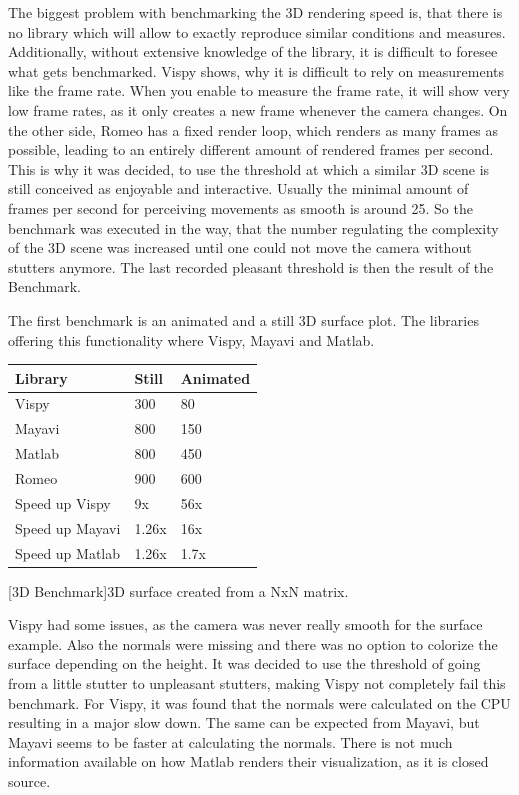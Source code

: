 The biggest problem with benchmarking the 3D rendering speed is, that there is no library which will allow to exactly reproduce similar conditions and measures. 
Additionally, without extensive knowledge of the library, it is difficult to foresee what gets benchmarked. 
Vispy shows, why it is difficult to rely on measurements like the frame rate. When you enable to measure the frame rate, it will show very low frame rates, as it only creates a new frame whenever the camera changes.
On the other side, Romeo has a fixed render loop, which renders as many frames as possible, leading to an entirely different amount of rendered frames per second. 
This is why it was decided, to use the threshold at which a similar 3D scene is still conceived as enjoyable and interactive. Usually the minimal amount of frames per second for perceiving movements as smooth is around 25.
So the benchmark was executed in the way, that the number regulating the complexity of the 3D scene was increased until one could not move the camera without stutters anymore. The last recorded pleasant threshold is then the result of the Benchmark.

The first benchmark is an animated and a still 3D surface plot. The libraries offering this functionality where Vispy, Mayavi and Matlab.

\begin{table}[htbp]
    \centering
    \begin{tabular}{l|l|l}
        \hline
        \textbf{Library} & \textbf{Still} & \textbf{Animated} \\
        \hline
        Vispy            & 300            & 80    \\
        Mayavi           & 800            & 150   \\
        Matlab           & 800            & 450   \\
        Romeo            & 900            & 600   \\
        \hline
        \hline
        Speed up Vispy   & 9x            & 56x   \\
        Speed up Mayavi  & 1.26x         & 16x   \\
        Speed up Matlab  & 1.26x         & 1.7x  \\
    \end{tabular}
    [3D Benchmark]{3D surface created from a NxN matrix.}
    \label{table:relativespeedoglw}
\end{table}
Vispy had some issues, as the camera was never really smooth for the surface example. Also the normals were missing and there was no option to colorize the surface depending on the height.
It was decided to use the threshold of going from a little stutter to unpleasant stutters, making Vispy not completely fail this benchmark.
For Vispy, it was found that the normals were calculated on the CPU resulting in a major slow down\cite{VispyGithub}. The same can be expected from Mayavi, but Mayavi seems to be faster at calculating the normals.
There is not much information available on how Matlab renders their visualization, as it is closed source.

